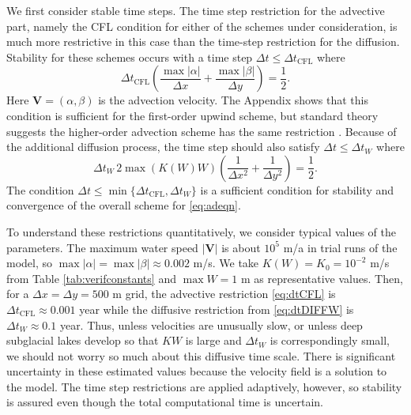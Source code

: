 \documentclass[11pt,final]{amsart}%
\newcommand\bV{\mathbf{V}}
\begin{document}
We first consider stable time steps.  The time step restriction for the advective part, namely the CFL condition for either of the schemes under consideration, is much more restrictive in this case than the time-step restriction for the diffusion.  Stability for these schemes occurs with a time step $\Delta t \le \Delta t_{\text{CFL}}$ where
\begin{equation}
\Delta t_{\text{CFL}} \left(\frac{\max |\alpha|}{\Delta x} + \frac{\max |\beta|}{\Delta y}\right) = \frac{1}{2}. \label{eq:dtCFL}
\end{equation}
Here $\bV=(\alpha,\beta)$ is the advection velocity.  The Appendix shows that this condition is sufficient for the first-order upwind scheme, but standard theory suggests the higher-order advection scheme has the same restriction \citep{HundsdorferVerwer2010}.  Because of the additional diffusion process, the time step should also satisfy $\Delta t \le \Delta t_{W}$ \citep{MortonMayers} where
\begin{equation}
\Delta t_W\, 2 \max(K(W) W) \left(\frac{1}{\Delta x^2} + \frac{1}{\Delta y^2}\right) = \frac{1}{2}. \label{eq:dtDIFFW}
\end{equation}
The condition $\Delta t \le \min\{\Delta t_{\text{CFL}}, \Delta t_W\}$ is a sufficient condition for stability and convergence of the overall scheme for \eqref{eq:adeqn}.

To understand these restrictions quantitatively, we consider typical values of the parameters.  The maximum water speed $|\bV|$ is about $10^5$ m/a in trial runs of the model, so $\max |\alpha| = \max |\beta| \approx 0.002$ m/s.  We take $K(W)=K_0=10^{-2}$ m/s from Table \ref{tab:verifconstants} and $\max W=1$ m as representative values.  Then, for a $\Delta x = \Delta y = 500$ m grid, the advective restriction \eqref{eq:dtCFL} is $\Delta t_{\text{CFL}} \approx 0.001$ year while the diffusive restriction from \eqref{eq:dtDIFFW} is $\Delta t_W \approx 0.1$ year.  Thus, unless velocities are unusually slow, or unless deep subglacial lakes develop so that $KW$ is large and $\Delta t_W$ is correspondingly small, we should not worry so much about this diffusive time scale.  There is significant uncertainty in these estimated values because the velocity field is a solution to the model.  The time step restrictions are applied adaptively, however, so stability is assured even though the total computational time is uncertain.
\end{document}
